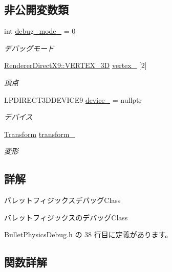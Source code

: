 \subsection*{非公開変数類}
\begin{DoxyCompactItemize}
\item 
int \mbox{\hyperlink{class_bullet_physics_debug_a7aec768464aa74fc9c97e10bff2375fe}{debug\+\_\+mode\+\_\+}} = 0
\begin{DoxyCompactList}\small\item\em デバッグモード \end{DoxyCompactList}\item 
\mbox{\hyperlink{class_renderer_direct_x9_1_1_v_e_r_t_e_x__3_d}{Renderer\+Direct\+X9\+::\+V\+E\+R\+T\+E\+X\+\_\+3D}} \mbox{\hyperlink{class_bullet_physics_debug_a4ff9e5b54a2830046ad94116443e036a}{vertex\+\_\+}} \mbox{[}2\mbox{]}
\begin{DoxyCompactList}\small\item\em 頂点 \end{DoxyCompactList}\item 
L\+P\+D\+I\+R\+E\+C\+T3\+D\+D\+E\+V\+I\+C\+E9 \mbox{\hyperlink{class_bullet_physics_debug_a0504ae564495b078f7805fcb42b66b6b}{device\+\_\+}} = nullptr
\begin{DoxyCompactList}\small\item\em デバイス \end{DoxyCompactList}\item 
\mbox{\hyperlink{class_transform}{Transform}} \mbox{\hyperlink{class_bullet_physics_debug_aba9367272ecf72569e20f740389e31e5}{transform\+\_\+}}
\begin{DoxyCompactList}\small\item\em 変形 \end{DoxyCompactList}\end{DoxyCompactItemize}


\subsection{詳解}
バレットフィジックスデバッグ\+Class 

バレットフィジックスのデバッグ\+Class 

 Bullet\+Physics\+Debug.\+h の 38 行目に定義があります。



\subsection{関数詳解}
\mbox{\label{class_bullet_physics_debug_a517d4d3b25ee5d9a83d984bb19e81ca4}} 
